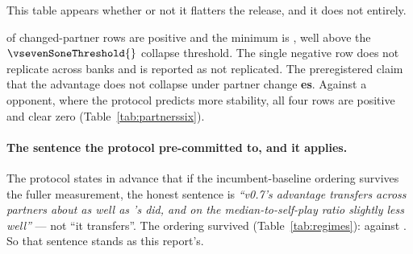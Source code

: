 This table appears whether or not it flatters the release, and it does not entirely.

\begin{table}[t]\centering
\caption{The partner-regime table against a \vfive{} opponent. Team A is [arm, P, P]; team B is three
copies of the opponent. Every delta carries an interval; the phase-5 results document compresses these
out of its own table and they are restored here (\S\ref{sec:corrections-intervals}).}
\label{tab:partners}
{\small}
\end{table}

\vsevenSonePositive{} of \vsevenSoneRows{} changed-partner rows are positive and the minimum is
\vsevenSoneMin{}, well above the $\vsevenSoneThreshold{}$ collapse threshold. The single negative row
does not replicate across banks and is reported as not replicated. The preregistered claim that the
advantage does not collapse under partner change \textbf{\vsevenSoneVerdict{}es}. Against a \vsix{}
opponent, where the protocol predicts more stability, all four rows are positive and clear zero
(Table~\ref{tab:partnerssix}).

\begin{table}[t]\centering
\caption{The same table against a \vsix{} opponent.}
\label{tab:partnerssix}
{\small}
\end{table}

\paragraph{The sentence the protocol pre-committed to, and it applies.}
The protocol states in advance that if the incumbent-baseline ordering survives the fuller
measurement, the honest sentence is \emph{``v0.7's advantage transfers across partners about as well
as \vsix{}'s did, and on the median-to-self-play ratio slightly less well''} --- not ``it transfers''.
The ordering survived (Table~\ref{tab:regimes}): \vsevenSoneRatio{} against
\vsevenBaseRatio{}. So that sentence stands as this report's.

\begin{table}[t]\centering
\caption{Transfer across partners, v0.7 over \vsix{} against \vsix{} over \vfive{}. The two holdout
rows are the same eight settings on the same two banks and are generated from the artifacts. The two
training rows are quoted from the protocol, which states them in advance; they are on training banks,
and the protocol records that its \vsix{}-over-\vfive{} training row is computed on three of the seven
changed settings only, so that row is not like-for-like with the holdout one above it. Reported and
\emph{not} gated, as the protocol requires.}
\label{tab:regimes}
{\small}
\end{table}

